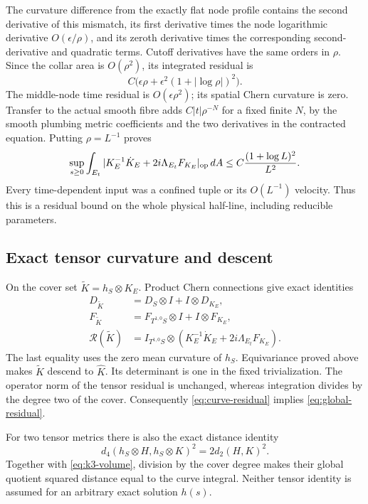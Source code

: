 The curvature difference from the exactly flat node profile contains
the second derivative of this mismatch, its first derivative times the
node logarithmic derivative $O(\epsilon/\rho)$, and its zeroth
derivative times the corresponding second-derivative and quadratic
terms. Cutoff derivatives have the same orders in $\rho$.
Since the collar area is $O(\rho^2)$, its integrated residual is
\[
 C\bigl(\epsilon\rho+
                 \epsilon^2(1+|\log\rho|)^2\bigr).
\]
The middle-node time residual is $O(\epsilon\rho^2)$; its spatial
Chern curvature is zero. Transfer to the actual smooth fibre adds
$C|t|\rho^{-N}$ for a fixed finite $N$, by the smooth plumbing
metric coefficients and the two derivatives in the contracted equation.
Putting $\rho=L^{-1}$ proves
\begin{equation}\label{eq:curve-residual}
 \sup_{s\ge0}\int_{E_t}
 |K_E^{-1}\dot K_E+2i\Lambda_{E_t}F_{K_E}|_{\mathrm{op}}\,dA
       \le C\frac{(1+\log L)^2}{L^2}.
\end{equation}
Every time-dependent input was a confined tuple or its
$O(L^{-1})$ velocity. Thus this is a residual bound on the whole
physical half-line, including reducible parameters.

\subsection{Exact tensor curvature and descent}
On the cover set $\widetilde K=h_S\otimes K_E$. Product Chern
connections give exact identities
\begin{equation}\label{eq:product-curvature}
 \begin{split}
 D_{\widetilde K}&=D_S\otimes I+I\otimes D_{K_E},\\
 F_{\widetilde K}&=F_{T^{1,0}S}\otimes I+I\otimes F_{K_E},\\
 \mathcal R(\widetilde K)&=I_{T^{1,0}S}\otimes
       (K_E^{-1}\dot K_E+2i\Lambda_{E_t}F_{K_E}).
 \end{split}
\end{equation}
The last equality uses the zero mean curvature of $h_S$. Equivariance
proved above makes $\widetilde K$ descend to $\widehat K$.
Its determinant is one in the fixed trivialization.
The operator norm of the tensor residual is unchanged, whereas
integration divides by the degree two of the cover. Consequently
\eqref{eq:curve-residual} implies \eqref{eq:global-residual}.

For two tensor metrics there is also the exact distance identity
\begin{equation}\label{eq:tensor-distance}
 d_4(h_S\otimes H,h_S\otimes K)^2=2d_2(H,K)^2.
\end{equation}
Together with \eqref{eq:k3-volume}, division by the cover degree
makes their global quotient squared distance equal to the curve
integral. Neither tensor identity is assumed for an arbitrary exact
solution $h(s)$.

